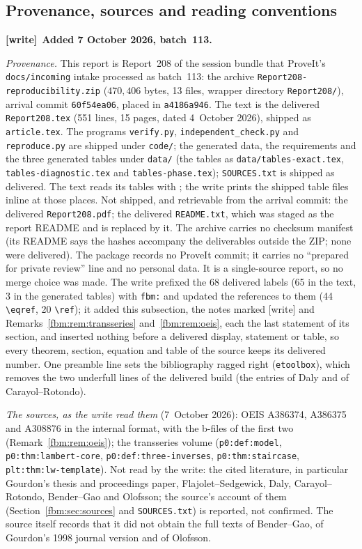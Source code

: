 \documentclass[11pt]{article}
\theoremstyle{remark}\newtheorem{remark}[theorem]{Remark}
\newcommand{\file}[1]{\nolinkurl{#1}}
\newenvironment{writenote}[1][]{\par\smallskip\begingroup\small
 \noindent\textbf{[write]}\if\relax\detokenize{#1}\relax\else~\textbf{#1.}\fi\ }%
 {\par\endgroup\smallskip}
\begin{document}
\subsection{Provenance, sources and reading conventions}\label{fbm:sec:provenance}
\begin{writenote}[Added 7 October 2026, batch~113]\raggedright
\emph{Provenance.} This report is Report~208 of the session bundle that
ProveIt's \file{docs/incoming} intake processed as batch~113: the archive
\file{Report208-reproducibility.zip} ($470{,}406$ bytes, 13 files, wrapper
directory \file{Report208/}), arrival commit \file{60f54ea06}, placed in
\file{a4186a946}. The text is the delivered \file{Report208.tex} (551 lines,
15 pages, dated 4~October 2026), shipped as \file{article.tex}. The programs
\file{verify.py}, \file{independent_check.py} and \file{reproduce.py} are
shipped under \file{code/}; the generated data, the requirements and the three
generated tables under \file{data/} (the tables as
\file{data/tables-exact.tex}, \file{tables-diagnostic.tex} and
\file{tables-phase.tex}); \file{SOURCES.txt} is shipped as delivered. The text
reads its tables with \verb||; the write prints the shipped
table files inline at those places. Not shipped, and retrievable from the
arrival commit: the delivered \file{Report208.pdf}; the delivered
\file{README.txt}, which was staged as the report README and is replaced by
it. The archive carries no checksum manifest (its README says the hashes
accompany the deliverables outside the ZIP; none were delivered). The package
records no ProveIt commit; it carries no ``prepared for private review'' line
and no personal data. It is a single-source report, so no merge choice was
made. The write prefixed the 68 delivered labels (65 in the text, 3 in the
generated tables) with \file{fbm:} and updated the references to them
(44 \verb|\eqref|, 20 \verb|\ref|); it added this subsection, the notes marked [write] and
Remarks~\ref{fbm:rem:transseries} and~\ref{fbm:rem:oeis}, each the last
statement of its section, and inserted nothing before a delivered display,
statement or table, so every theorem, section, equation and table of the
source keeps its delivered number. One preamble line sets the bibliography
ragged right (\texttt{etoolbox}), which removes the two underfull lines of the
delivered build (the entries of Daly and of Carayol--Rotondo).

\emph{The sources, as the write read them} (7~October 2026): OEIS A386374,
A386375 and A308876 in the internal format, with the b-files of the first two
(Remark~\ref{fbm:rem:oeis}); the transseries volume
(\file{p0:def:model}, \file{p0:thm:lambert-core}, \file{p0:def:three-inverses},
\file{p0:thm:staircase}, \file{plt:thm:lw-template}). Not read by the write:
the cited literature, in particular Gourdon's thesis and proceedings paper,
Flajolet--Sedgewick, Daly, Carayol--Rotondo, Bender--Gao and Olofsson; the
source's account of them (Section~\ref{fbm:sec:sources} and
\file{SOURCES.txt}) is reported, not confirmed. The source itself records that
it did not obtain the full texts of Bender--Gao, of Gourdon's 1998 journal
version and of Olofsson.


\end{writenote}
\end{document}

